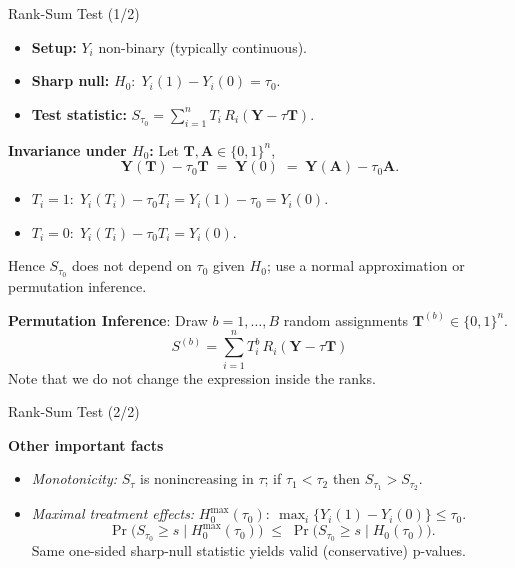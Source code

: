 \documentclass[10pt, handout]{beamer}
\theoremstyle{plain}
\begin{document}
\begin{frame}{Rank-Sum Test (1/2)}

\begin{itemize}
  \setlength{\itemsep}{6pt}
  \item \textbf{Setup:} \(Y_i\) non-binary (typically continuous).
  \item \textbf{Sharp null:} \(H_0:\; Y_i(1)-Y_i(0)=\tau_0\).
  \item \textbf{Test statistic:} \(S_{\tau_0}=\sum_{i=1}^n T_i\,R_i(\bm Y-\tau\bm T)\).
\end{itemize}

\pause
\vspace{0.8em}
\textbf{Invariance under \(H_0\):} Let \(\bm T,\bm A\in\{0,1\}^n\),
  \[
    \bm Y(\bm T)-\tau_0\bm T \;=\; \bm Y(0) \;=\; \bm Y(\bm A)-\tau_0\bm A.
  \]
  \vspace{-1em}
  \begin{itemize}
    \setlength{\itemsep}{4pt}
    \item \(T_i=1:\; Y_i(T_i)-\tau_0 T_i=Y_i(1)-\tau_0=Y_i(0)\).
    \item \(T_i=0:\; Y_i(T_i)-\tau_0 T_i=Y_i(0)\).
  \end{itemize}
  Hence \(S_{\tau_0}\) does not depend on \(\tau_0\) given \(H_0\); use a normal approximation or permutation inference.

\pause
\vspace{0.8em}
\textbf{Permutation Inference}: Draw $b = 1,\ldots,B$ random assignments $\bm{T}^{(b)} \in \{0,1\}^n$.
  \[
  S^{(b)} = \sum_{i=1}^n T^b_i \,R_i(\bm Y-\tau\bm T)
  \]
  Note that we do not change the expression inside the ranks.
\end{frame}

\begin{frame}{Rank-Sum Test (2/2)}

\vspace{0.8em}
\textbf{Other important facts}

\begin{itemize}
  \setlength{\itemsep}{8pt}
    \pause
  \item \emph{Monotonicity:} \(S_\tau\) is nonincreasing in \(\tau\); if \(\tau_1<\tau_2\) then \(S_{\tau_1}>S_{\tau_2}\).

    \pause
  \item \emph{Maximal treatment effects:} \(H^{\max}_0(\tau_0):\ \max_i\{Y_i(1)-Y_i(0)\}\le\tau_0\).
  \[
    \Pr\!\big(S_{\tau_0}\!\ge s \mid H^{\max}_0(\tau_0)\big)
    \;\le\;
    \Pr\!\big(S_{\tau_0}\!\ge s \mid H_0(\tau_0)\big).
  \]
  Same one-sided sharp-null statistic yields valid (conservative) p-values.
\end{itemize}

\end{frame}
\end{document}
